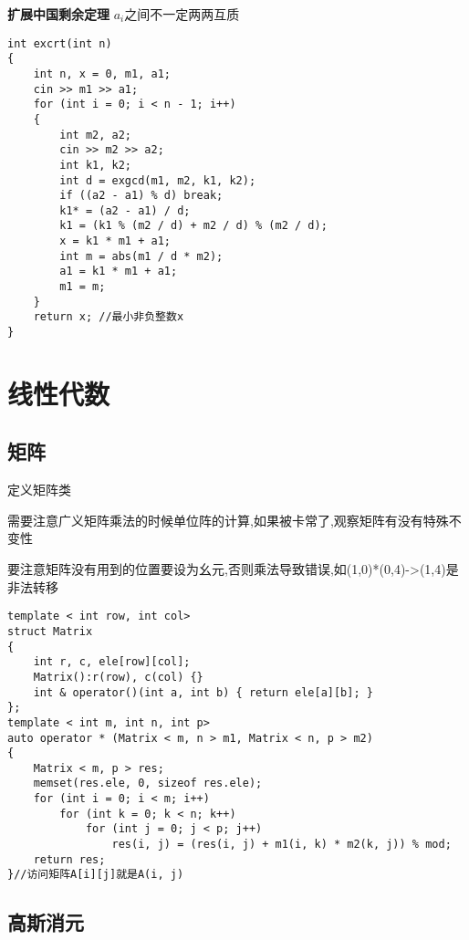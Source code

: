 \documentclass[a4paper,fontset=none]{ctexart}
\begin{document}
\textbf{扩展中国剩余定理} $a_i$之间不一定两两互质

\begin{verbatim}
int excrt(int n)
{
    int n, x = 0, m1, a1;
    cin >> m1 >> a1;
    for (int i = 0; i < n - 1; i++)
    {
        int m2, a2;
        cin >> m2 >> a2;
        int k1, k2;
        int d = exgcd(m1, m2, k1, k2);
        if ((a2 - a1) % d) break;
        k1* = (a2 - a1) / d;
        k1 = (k1 % (m2 / d) + m2 / d) % (m2 / d);
        x = k1 * m1 + a1;
        int m = abs(m1 / d * m2);
        a1 = k1 * m1 + a1;
        m1 = m;
    }
    return x; //最小非负整数x
}
\end{verbatim}

\section{线性代数}
\subsection{矩阵}

定义矩阵类

需要注意广义矩阵乘法的时候单位阵的计算,如果被卡常了,观察矩阵有没有特殊不变性

要注意矩阵没有用到的位置要设为幺元,否则乘法导致错误,如(1,0)*(0,4)->(1,4)是非法转移

\begin{verbatim}
template < int row, int col>
struct Matrix
{
    int r, c, ele[row][col];
    Matrix():r(row), c(col) {}
    int & operator()(int a, int b) { return ele[a][b]; }
};
template < int m, int n, int p>
auto operator * (Matrix < m, n > m1, Matrix < n, p > m2)
{
    Matrix < m, p > res;
    memset(res.ele, 0, sizeof res.ele);
    for (int i = 0; i < m; i++)
        for (int k = 0; k < n; k++)
            for (int j = 0; j < p; j++)
                res(i, j) = (res(i, j) + m1(i, k) * m2(k, j)) % mod;
    return res;
}//访问矩阵A[i][j]就是A(i, j)
\end{verbatim}
\subsection{高斯消元}
\end{document}
